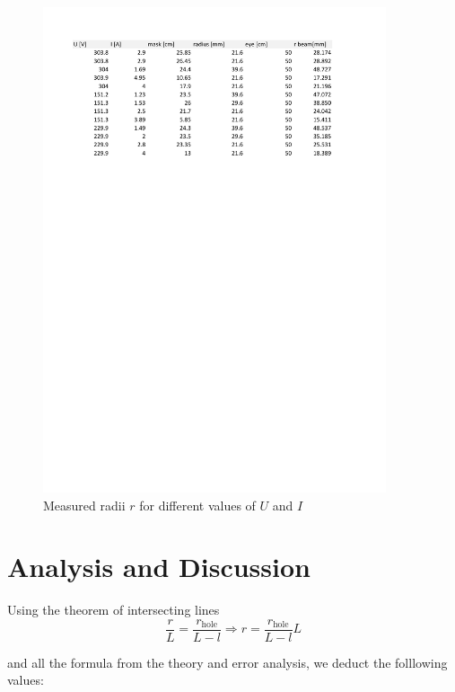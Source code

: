 \documentclass{scrreprt}
\begin{document}
\begin{figure}[H]
	\centering
  \includegraphics[width=0.9\textwidth]{diag/measurements.pdf}
	\caption{Measured radii $r$ for different values of $U$ and $I$}
	\label{fig:measurements}
\end{figure}

\section{Analysis and Discussion}
Using the theorem of intersecting lines
\begin{equation}
\frac{r}{L	} = \frac{r_{\text{hole}}}{L-l} \Longrightarrow r = \frac{r_{\text{hole}}}{L-l} L
\end{equation}

and all the formula from the theory and error analysis, we deduct the folllowing values:
\end{document}
